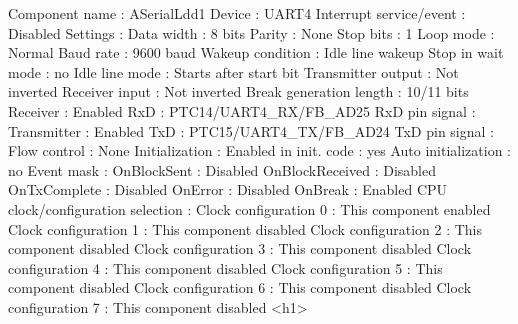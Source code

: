 \begin{DoxyCode}
            Component name                                 : ASerialLdd1
            Device                                         : UART4
            Interrupt service/\textcolor{keyword}{event}                        : Disabled
            Settings                                       : 
              Data width                                   : 8 bits
              Parity                                       : None
              Stop bits                                    : 1
              Loop mode                                    : Normal
              Baud rate                                    : 9600 baud
              Wakeup condition                             : Idle line wakeup
              Stop in wait mode                            : no
              Idle line mode                               : Starts after start bit
              Transmitter output                           : Not inverted
              Receiver input                               : Not inverted
              Break generation length                      : 10/11 bits
              Receiver                                     : Enabled
                RxD                                        : PTC14/UART4\_RX/FB\_AD25
                RxD pin signal                             : 
              Transmitter                                  : Enabled
                TxD                                        : PTC15/UART4\_TX/FB\_AD24
                TxD pin signal                             : 
              Flow control                                 : None
            Initialization                                 : 
              Enabled in init. code                        : yes
              Auto initialization                          : no
              Event mask                                   : 
                OnBlockSent                                : Disabled
                OnBlockReceived                            : Disabled
                OnTxComplete                               : Disabled
                OnError                                    : Disabled
                OnBreak                                    : Enabled
            CPU clock/configuration selection              : 
              Clock configuration 0                        : This component enabled
              Clock configuration 1                        : This component disabled
              Clock configuration 2                        : This component disabled
              Clock configuration 3                        : This component disabled
              Clock configuration 4                        : This component disabled
              Clock configuration 5                        : This component disabled
              Clock configuration 6                        : This component disabled
              Clock configuration 7                        : This component disabled
<h1>
\end{DoxyCode}
